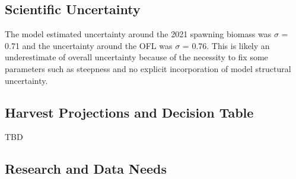 \documentclass[11pt,
  english,
  a4paper,
]{article}
\begin{document}
\leavevmode\tagmcend\tagstructend\par


\hypertarget{scientific-uncertainty}{%
\subsection*{Scientific Uncertainty}\label{scientific-uncertainty}}

\leavevmode\tagmcend\tagstructend


The model estimated uncertainty around the 2021 spawning biomass was {\(\sigma\)\leavevmode\tagmcend\tagstructend} = 0.71 and the uncertainty around the OFL was {\(\sigma\)\leavevmode\tagmcend\tagstructend} = 0.76. This is likely an underestimate of overall uncertainty because of the necessity to fix some parameters such as steepness and no explicit incorporation of model structural uncertainty.

\leavevmode\tagmcend\tagstructend\par


\hypertarget{harvest-projections-and-decision-table}{%
\subsection*{Harvest Projections and Decision Table}\label{harvest-projections-and-decision-table}}

\leavevmode\tagmcend\tagstructend


TBD

\leavevmode\tagmcend\tagstructend\par


\hypertarget{research-and-data-needs}{%
\subsection*{Research and Data Needs}\label{research-and-data-needs}}
\end{document}
